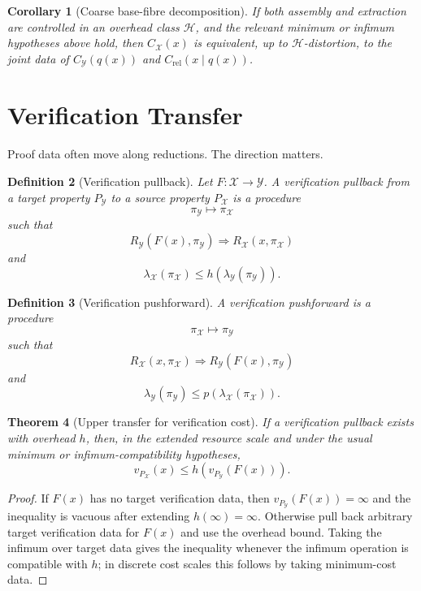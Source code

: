 \documentclass[11pt]{article}
\newtheorem{theorem}{Theorem}[section]
\newtheorem{corollary}[theorem]{Corollary}
\newtheorem{definition}[theorem]{Definition}
\begin{document}
\begin{corollary}[Coarse base-fibre decomposition]
If both assembly and extraction are controlled in an overhead class \(\mathcal H\), and the relevant minimum or infimum hypotheses above hold, then \(C_\mathcal X(x)\) is equivalent, up to \(\mathcal H\)-distortion, to the joint data of \(C_\mathcal Y(q(x))\) and \(C_{\mathrm{rel}}(x\mid q(x))\).
\end{corollary}

\section{Verification Transfer}

Proof data often move along reductions. The direction matters.

\begin{definition}[Verification pullback]
Let \(F:\mathcal X\to\mathcal Y\). A verification pullback from a target property \(P_\mathcal Y\) to a source property \(P_\mathcal X\) is a procedure
\[
\pi_\mathcal Y\mapsto \pi_\mathcal X
\]
such that
\[
R_\mathcal Y(F(x),\pi_\mathcal Y)
\Longrightarrow
R_\mathcal X(x,\pi_\mathcal X)
\]
and
\[
\lambda_\mathcal X(\pi_\mathcal X)
\leq
h(\lambda_\mathcal Y(\pi_\mathcal Y)).
\]
\end{definition}

\begin{definition}[Verification pushforward]
A verification pushforward is a procedure
\[
\pi_\mathcal X\mapsto \pi_\mathcal Y
\]
such that
\[
R_\mathcal X(x,\pi_\mathcal X)
\Longrightarrow
R_\mathcal Y(F(x),\pi_\mathcal Y)
\]
and
\[
\lambda_\mathcal Y(\pi_\mathcal Y)
\leq
p(\lambda_\mathcal X(\pi_\mathcal X)).
\]
\end{definition}

\begin{theorem}[Upper transfer for verification cost]
If a verification pullback exists with overhead \(h\), then, in the extended resource scale and under the usual minimum or infimum-compatibility hypotheses,
\[
v_{P_\mathcal X}(x)
\leq
h(v_{P_\mathcal Y}(F(x))).
\]
\end{theorem}

\begin{proof}
If \(F(x)\) has no target verification data, then \(v_{P_\mathcal Y}(F(x))=\infty\) and the inequality is vacuous after extending \(h(\infty)=\infty\). Otherwise pull back arbitrary target verification data for \(F(x)\) and use the overhead bound. Taking the infimum over target data gives the inequality whenever the infimum operation is compatible with \(h\); in discrete cost scales this follows by taking minimum-cost data.
\end{proof}
\end{document}
